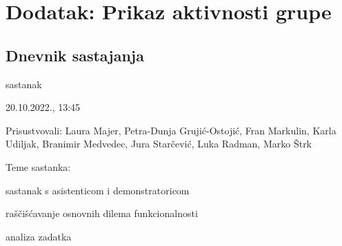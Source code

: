 \chapter*{Dodatak: Prikaz aktivnosti grupe}
		
		\section*{Dnevnik sastajanja}
		

		\begin{packed_enum}
			\item  sastanak
			
			\item[] \begin{packed_item}
				\item 20.10.2022., 13:45
				\item Prisustvovali: Laura Majer, Petra-Dunja Grujić-Ostojić, Fran Markulin, Karla Udiljak, Branimir Medvedec, Jura Starčević, Luka Radman, Marko Štrk
				\item Teme sastanka: 
				\begin{packed_item}
					\item  sastanak s asistenticom i demonstratoricom
					\item  raščišćavanje osnovnih dilema funkcionalnosti
					\item  analiza zadatka
				\end{packed_item}
			\end{packed_item}
			

\end{packed_enum}
